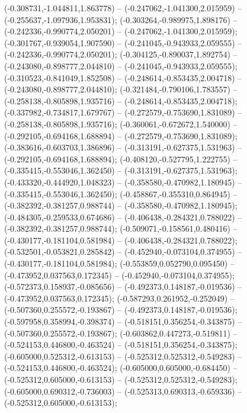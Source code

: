 (-0.308731,-1.044811,1.863778) -- (-0.247062,-1.041300,2.015959) -- (-0.255637,-1.097936,1.953831);
 (-0.303264,-0.989975,1.898176) -- (-0.242336,-0.990774,2.050201) -- (-0.247062,-1.041300,2.015959);
 (-0.301767,-0.939054,1.907590) -- (-0.241045,-0.943933,2.059555) -- (-0.242336,-0.990774,2.050201);
 (-0.304125,-0.890037,1.892754) -- (-0.243080,-0.898777,2.044810) -- (-0.241045,-0.943933,2.059555);
 (-0.310523,-0.841049,1.852508) -- (-0.248614,-0.853435,2.004718) -- (-0.243080,-0.898777,2.044810);
 (-0.321484,-0.790106,1.783557) -- (-0.258138,-0.805898,1.935716) -- (-0.248614,-0.853435,2.004718);
 (-0.337982,-0.734817,1.679767) -- (-0.272579,-0.753690,1.831089) -- (-0.258138,-0.805898,1.935716);
 (-0.360061,-0.672672,1.540000) -- (-0.292105,-0.694168,1.688894) -- (-0.272579,-0.753690,1.831089);
 (-0.383616,-0.603703,1.386896) -- (-0.313191,-0.627375,1.531963) -- (-0.292105,-0.694168,1.688894);
 (-0.408120,-0.527795,1.222755) -- (-0.335415,-0.553046,1.362450) -- (-0.313191,-0.627375,1.531963);
 (-0.433320,-0.444920,1.048323) -- (-0.358580,-0.470982,1.180945) -- (-0.335415,-0.553046,1.362450);
 (-0.458867,-0.355310,0.864945) -- (-0.382392,-0.381257,0.988744) -- (-0.358580,-0.470982,1.180945);
 (-0.484305,-0.259533,0.674686) -- (-0.406438,-0.284321,0.788022) -- (-0.382392,-0.381257,0.988744);
 (-0.509071,-0.158561,0.480416) -- (-0.430177,-0.181104,0.581984) -- (-0.406438,-0.284321,0.788022);
 (-0.532501,-0.053821,0.285842) -- (-0.452940,-0.073104,0.374955) -- (-0.430177,-0.181104,0.581984);
 (-0.553859,0.052790,0.095450) -- (-0.473952,0.037563,0.172345) -- (-0.452940,-0.073104,0.374955);
 (-0.572373,0.158937,-0.085656) -- (-0.492373,0.148187,-0.019536) -- (-0.473952,0.037563,0.172345);
 (-0.587293,0.261952,-0.252049) -- (-0.507360,0.255572,-0.193867) -- (-0.492373,0.148187,-0.019536);
 (-0.597958,0.358994,-0.398374) -- (-0.518151,0.356254,-0.343875) -- (-0.507360,0.255572,-0.193867);
 (-0.603862,0.447273,-0.519811) -- (-0.524153,0.446800,-0.463524) -- (-0.518151,0.356254,-0.343875);
 (-0.605000,0.525312,-0.613153) -- (-0.525312,0.525312,-0.549283) -- (-0.524153,0.446800,-0.463524);
 (-0.605000,0.605000,-0.684450) -- (-0.525312,0.605000,-0.613153) -- (-0.525312,0.525312,-0.549283);
 (-0.605000,0.690312,-0.736003) -- (-0.525313,0.690313,-0.659336) -- (-0.525312,0.605000,-0.613153);
